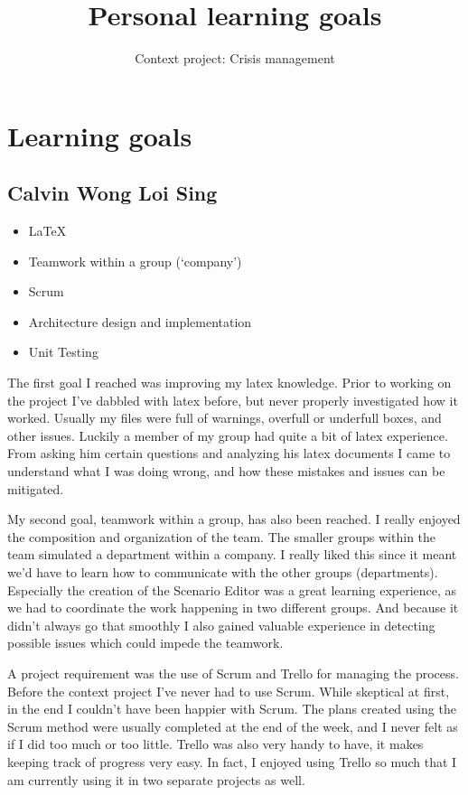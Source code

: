 \documentclass[a4paper]{article}
\begin{document}
\title{Personal learning goals}
\author{Context project: Crisis management}

\maketitle

\section*{Learning goals} 

\subsection*{Calvin Wong Loi Sing}
\begin{itemize}
 	\item \LaTeX
	\item Teamwork within a group (`company')
	\item Scrum
	\item Architecture design and  implementation
	\item Unit Testing
\end{itemize}
The first goal I reached was improving my latex knowledge. Prior to working on the project I've dabbled with latex before, but never properly investigated how it worked. Usually my files were full of warnings, overfull or underfull boxes, and other issues. Luckily a member of my group had quite a bit of latex experience. From asking him certain questions and analyzing his latex documents I came to understand what I was doing wrong, and how these mistakes and issues can be mitigated.

My second goal, teamwork within a group, has also been reached. I really enjoyed the composition and organization of the team. The smaller groups within the team simulated a department within a company. I really liked this since it meant we'd have to learn how to communicate with the other groups (departments). Especially the creation of the Scenario Editor was a great learning experience, as we had to coordinate the work happening in two different groups. And because it didn't always go that smoothly I also gained valuable experience in detecting possible issues which could impede the teamwork. 

A project requirement was the use of Scrum and Trello for managing the process. Before the context project I've never had to use Scrum. While skeptical at first, in the end I couldn't have been happier with Scrum. The plans created using the Scrum method were usually completed at the end of the week, and I never felt as if I did too much or too little. Trello was also very handy to have, it makes keeping track of progress very easy. In fact, I enjoyed using Trello so much that I am currently using it in two separate projects as well.
\end{document}
